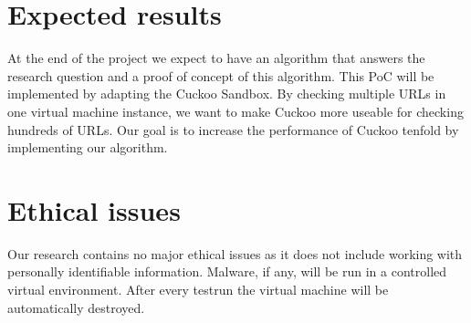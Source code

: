 \documentclass{scrartcl}
\begin{document}
\section{Expected results}

At the end of the project we expect to have an algorithm that answers the research question and a proof of concept of this algorithm. This PoC will be implemented by adapting the Cuckoo Sandbox. By checking multiple URLs in one virtual machine instance, we want to make Cuckoo more useable for checking hundreds of URLs. Our goal is to increase the performance of Cuckoo tenfold by implementing our algorithm.

\section{Ethical issues}

Our research contains no major ethical issues as it does not include working with personally identifiable information. Malware, if any, will be run in a controlled virtual environment. After every testrun the virtual machine will be automatically destroyed.




\end{document}
